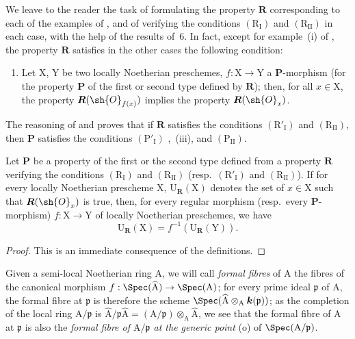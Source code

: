 \begin{remark}[7.3.11]
\label{IV.7.3.11}
We leave to the reader the task of formulating the property $\boldsymbol{R}$ corresponding to each of the examples of , and of verifying the conditions $(\mathrm{R_I})$ and $(\mathrm{R_{II}})$ in each case, with the help of the results of \textsection\,6.
In fact, except for example~(i) of , the property $\boldsymbol{R}$ satisfies in the other cases the following condition:
\begin{enumerate}
  \item[$(\mathrm{R}'_\mathrm{I})$] Let $\mathrm{X}$, $\mathrm{Y}$ be two locally Noetherian preschemes, $f:\mathrm{X}\to\mathrm{Y}$ a $\boldsymbol{P}$-morphism (for the property $\boldsymbol{P}$ of the first or second type defined by $\boldsymbol{R}$); then, for all $x\in\mathrm{X}$, the property $\boldsymbol{R}(\sh{O}_{f(x)})$ implies the property $\boldsymbol{R}(\sh{O}_x)$.
\end{enumerate}
The reasoning of  and  proves that if $\boldsymbol{R}$ satisfies the conditions $(\mathrm{R}'_\mathrm{I})$ and $(\mathrm{R_{II}})$, then $\boldsymbol{P}$ satisfies the conditions $(\mathrm{P'_I})$ ,~(iii), and $(\mathrm{P_{II}})$.
\end{remark}

\begin{proposition}[7.3.12]
\label{IV.7.3.12}
Let $\boldsymbol{P}$ be a property of the first or the second type defined from a property $\boldsymbol{R}$ verifying the conditions $(\mathrm{R_I})$ and $(\mathrm{R_{II}})$ (resp.~$(\mathrm{R}'_\mathrm{I})$ and $(\mathrm{R_{II}})$).
If for every locally Noetherian prescheme $\mathrm{X}$, $\mathrm{U}_{\boldsymbol{R}}(\mathrm{X})$ denotes the set of $x\in\mathrm{X}$ such that $\boldsymbol{R}(\sh{O}_x)$ is true, then, for every regular morphism (resp.~every $\boldsymbol{P}$-morphism) $f:\mathrm{X}\to\mathrm{Y}$ of locally Noetherian preschemes, we have
\[
  \mathrm{U}_{\boldsymbol{R}}(\mathrm{X})=f^{-1}(\mathrm{U}_{\boldsymbol{R}}(\mathrm{Y})).
  \tag{7.3.12.1}
\label{IV.7.3.12.1}
\]
\end{proposition}

\begin{proof}
This is an immediate consequence of the definitions.
\end{proof}

\begin{env}[7.3.13]
\label{IV.7.3.13}
Given a semi-local Noetherian ring $\mathrm{A}$, we will call \emph{formal fibres} of $\mathrm{A}$ the fibres of the canonical morphism $f:\Spec(\widehat{\mathrm{A}})\to\Spec(\mathrm{A})$; for every prime ideal $\mathfrak{p}$ of $\mathrm{A}$, the formal fibre at $\mathfrak{p}$ is therefore the scheme $\Spec(\widehat{\mathrm{A}}\otimes_\mathrm{A}\boldsymbol{k}(\mathfrak{p}))$; as the completion of the local ring $\mathrm{A}/\mathfrak{p}$ is $\widehat{\mathrm{A}}/\mathfrak{p}\widehat{\mathrm{A}}=(\mathrm{A}/\mathfrak{p})\otimes_\mathrm{A}\widehat{\mathrm{A}}$, we see that the formal fibre of $\mathrm{A}$ at $\mathfrak{p}$ is also the \emph{formal fibre of $\mathrm{A}/\mathfrak{p}$ at the generic point} (o) of $\Spec(\mathrm{A}/\mathfrak{p})$.
\end{env}

